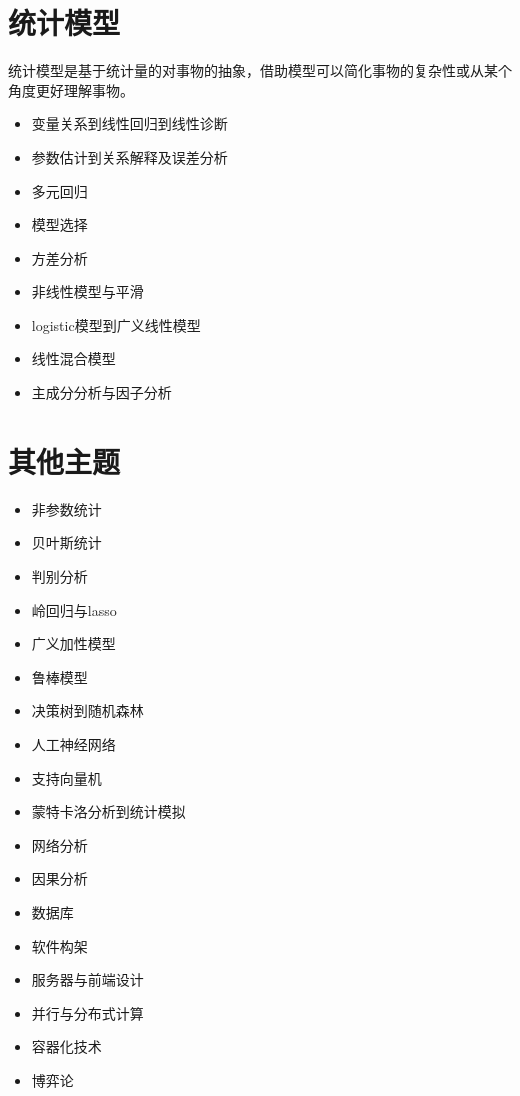 \documentclass[]{book}
\providecommand{\tightlist}{%
  \setlength{\itemsep}{0pt}\setlength{\parskip}{0pt}}
\begin{document}
\hypertarget{sm}{%
\section{统计模型}\label{sm}}

统计模型是基于统计量的对事物的抽象，借助模型可以简化事物的复杂性或从某个角度更好理解事物。

\begin{itemize}
\tightlist
\item
  变量关系到线性回归到线性诊断
\item
  参数估计到关系解释及误差分析
\item
  多元回归
\item
  模型选择
\item
  方差分析
\item
  非线性模型与平滑
\item
  logistic模型到广义线性模型
\item
  线性混合模型
\item
  主成分分析与因子分析
\end{itemize}

\hypertarget{ux5176ux4ed6ux4e3bux9898}{%
\section{其他主题}\label{ux5176ux4ed6ux4e3bux9898}}

\begin{itemize}
\tightlist
\item
  非参数统计
\item
  贝叶斯统计
\item
  判别分析
\item
  岭回归与lasso
\item
  广义加性模型
\item
  鲁棒模型
\item
  决策树到随机森林
\item
  人工神经网络
\item
  支持向量机
\item
  蒙特卡洛分析到统计模拟
\item
  网络分析
\item
  因果分析
\item
  数据库
\item
  软件构架
\item
  服务器与前端设计
\item
  并行与分布式计算
\item
  容器化技术
\item
  博弈论
\end{itemize}
\end{document}
